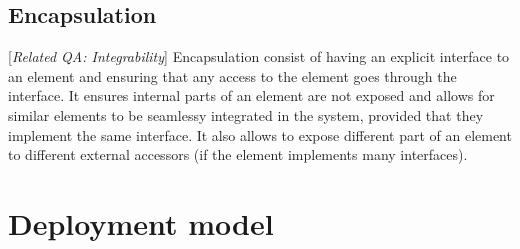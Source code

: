 \documentclass{article}
\begin{document}
\subsection*{Encapsulation}[\textit{Related QA: Integrability}]
Encapsulation consist of having an explicit interface to an element and ensuring that any access to the element goes through the interface. It ensures internal parts of an element are not exposed and allows for similar elements to be seamlessy integrated in the system, provided that they implement the same interface. It also allows to expose different part of an element to different external accessors (if the element implements many interfaces).

\section{Deployment model}
\end{document}
